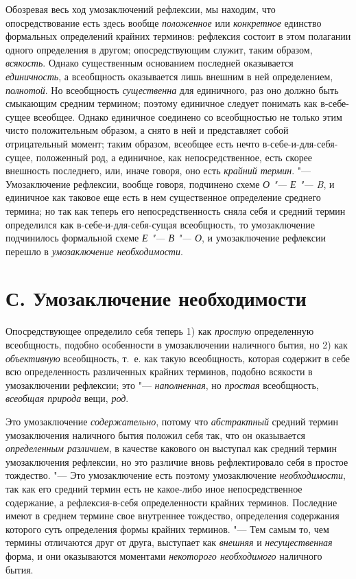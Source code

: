 Обозревая весь ход умозаключений рефлексии, мы находим, что
опосредствование есть здесь вообще
{\em положенное} или
{\em конкретное} единство
формальных определений крайних терминов: рефлексия состоит в этом полагании
одного определения в другом; опосредствующим служит, таким образом,
{\em всякость}. Однако
существенным основанием последней оказывается
{\em единичность}, а
всеобщность оказывается лишь внешним в ней определением,
{\em полнотой}. Но
всеобщность {\em существенна}
для единичного, раз оно должно быть смыкающим средним
термином; поэтому единичное следует понимать как в-себе-сущее всеобщее.
Однако единичное соединено со всеобщностью не только этим чисто
положительным образом, а снято в ней и представляет собой отрицательный
момент; таким образом, всеобщее есть нечто в-себе-и-для-себя-сущее,
положенный род, а единичное, как непосредственное, есть скорее внешность
последнего, или, иначе говоря, оно есть
{\em крайний термин}. "---
Умозаключение рефлексии, вообще говоря, подчинено схеме
{\em О "--- Е "--- B},
и единичное как таковое еще есть в нем существенное
определение среднего термина; но так как теперь его непосредственность
сняла себя и средний термин определился как
в-себе-и-для-себя-сущая всеобщность, то умозаключение
подчинилось формальной схеме {\em Е
"--- В "--- О}, и умозаключение
рефлексии перешло в {\em умозаключение
необходимости}.

\section[С. Умозаключение необходимости]{С. Умозаключение необходимости}
Опосредствующее определило себя теперь 1) как
{\em простую}
определенную всеобщность, подобно особенности в умозаключении
наличного бытия, но 2) как
{\em объективную}
всеобщность, т.~е. как такую всеобщность, которая содержит в
себе всю определенность различенных крайних терминов, подобно всякости в
умозаключении рефлексии; это
"--- {\em наполненная}, но
{\em простая}
всеобщность, {\em всеобщая
природа} вещи,
{\em род}.

Это умозаключение
{\em содержательно},
потому что
{\em абстрактный} средний
термин умозаключения наличного бытия положил себя так, что он оказывается
{\em определенным различием},
в качестве какового он выступал как средний термин
умозаключения рефлексии, но это различие вновь рефлектировало себя в
простое тождество. "--- Это умозаключение есть поэтому
умозаключение {\em необходимости},
так как его средний термин есть не какое-либо иное
непосредственное содержание, а рефлексия-в-себя определенности крайних
терминов. Последние имеют в среднем термине свое внутреннее тождество,
определения содержания которого суть определения формы крайних терминов. "---
Тем самым то, чем термины отличаются друг от друга, выступает
как {\em внешняя} и
{\em несущественная}
форма, и они оказываются моментами
{\em некоторого необходимого}
наличного бытия.

